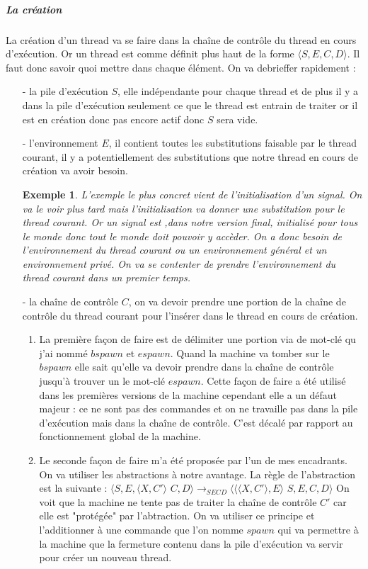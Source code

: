 \documentclass[10pt,a4paper]{report}
\newtheorem{ex}{Exemple}
\begin{document}
	
	\subparagraph{La création}
	La création d'un thread va se faire dans la chaîne de contrôle du thread en cours d'exécution. Or un thread est comme définit plus haut de la forme $\langle S,E,C,D\rangle$. Il faut donc savoir quoi mettre dans chaque élément. On va debrieffer rapidement : 
	\begin{enumerate}
		\item[-] la pile d'exécution $S$, elle indépendante pour chaque thread et de plus il y a dans la pile d'exécution seulement ce que le thread est entrain de traiter or il est en création donc pas encore actif donc $S$ sera vide.
		\medbreak
		
		\item[-] l'environnement $E$, il contient toutes les substitutions faisable par le thread courant, il y a potentiellement des substitutions que notre thread en cours de création va avoir besoin.
		\begin{ex}
			L'exemple le plus concret vient de l'initialisation d'un signal. On va le voir plus tard mais l'initialisation va donner une substitution pour le thread courant. Or un signal est ,dans notre version final, initialisé pour tous le monde donc tout le monde doit pouvoir y accèder. On a donc besoin de l'environnement du thread courant ou un environnement général et un environnement privé. On va se contenter de prendre l'environnement du thread courant dans un premier temps.
		\end{ex}
		\medbreak
		
		\item[-] la chaîne de contrôle $C$, on va devoir prendre une portion de la chaîne de contrôle du thread courant pour l'insérer dans le thread en cours de création. 
		\begin{enumerate}
			\item La première façon de faire est de délimiter une portion via de mot-clé qu j'ai nommé $bspawn$ et $espawn$. Quand la machine va tomber sur le $bspawn$ elle sait qu'elle va devoir prendre dans la chaîne de contrôle jusqu'à trouver un le mot-clé $espawn$. Cette façon de faire a été utilisé dans les premières versions de la machine cependant elle a un défaut majeur : ce ne sont pas des commandes et on ne travaille pas dans la pile d'exécution mais dans la chaîne de contrôle. C'est décalé par rapport au fonctionnement global de la machine.
			\medbreak
			
			\item Le seconde façon de faire m'a été proposée par l'un de mes encadrants. On va utiliser les abstractions à notre avantage. La règle de l'abstraction est la suivante : 
			\smallbreak
			$\langle S,E,\langle X,C'\rangle$ $C,D\rangle
			\longrightarrow_{SECD} 
			\langle \langle\langle X,C'\rangle,E\rangle$ $S,E,C,D\rangle$
			\smallbreak
			On voit que la machine ne tente pas de traiter la chaîne de contrôle $C'$ car elle est "protégée" par l'abtraction. On va utiliser ce principe et l'additionner à une commande que l'on nomme $spawn$ qui va permettre à la machine que la fermeture contenu dans la pile d'exécution va servir pour créer un nouveau thread.
			\medbreak
			

\end{enumerate}
\end{enumerate}
\end{document}
